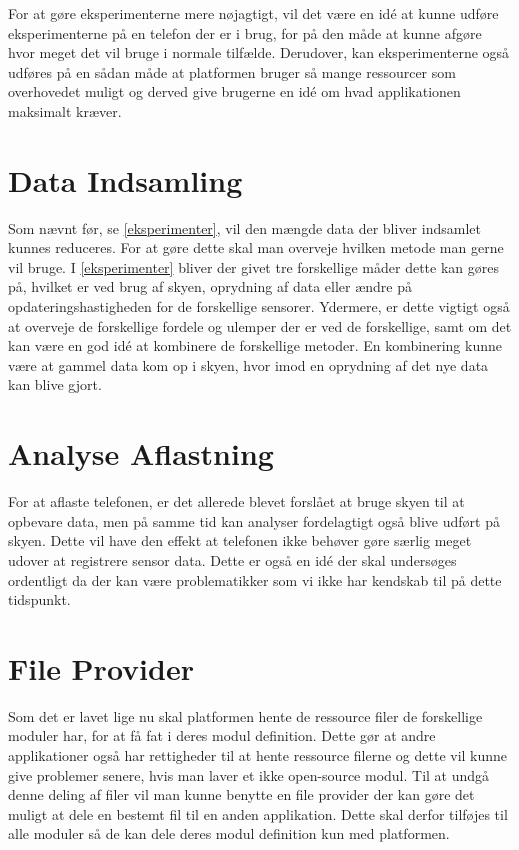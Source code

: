 For at gøre eksperimenterne mere nøjagtigt, vil det være en idé at kunne udføre eksperimenterne på en telefon der er i brug, for på den måde at kunne afgøre hvor meget det vil bruge i normale tilfælde.
Derudover, kan eksperimenterne også udføres på en sådan måde at platformen bruger så mange ressourcer som overhovedet muligt og derved give brugerne en idé om hvad applikationen maksimalt kræver. 

\section{Data Indsamling}
Som nævnt før, se \cref{eksperimenter}, vil den mængde data der bliver indsamlet kunnes reduceres.
For at gøre dette skal man overveje hvilken metode man gerne vil bruge.
I \cref{eksperimenter} bliver der givet tre forskellige måder dette kan gøres på, hvilket er ved brug af skyen, oprydning af data eller ændre på opdateringshastigheden for de forskellige sensorer.
Ydermere, er dette vigtigt også at overveje de forskellige fordele og ulemper der er ved de forskellige, samt om det kan være en god idé at kombinere de forskellige metoder.
En kombinering kunne være at gammel data kom op i skyen, hvor imod en oprydning af det nye data kan blive gjort.

\section{Analyse Aflastning}
For at aflaste telefonen, er det allerede blevet forslået at bruge skyen til at opbevare data, men på samme tid kan analyser fordelagtigt også blive udført på skyen. 
Dette vil have den effekt at telefonen ikke behøver gøre særlig meget udover at registrere sensor data.
Dette er også en idé der skal undersøges ordentligt da der kan være problematikker som vi ikke har kendskab til på dette tidspunkt. 

\section{File Provider}
Som det er lavet lige nu skal platformen hente de ressource filer de forskellige moduler har, for at få fat i deres modul definition.
Dette gør at andre applikationer også har rettigheder til at hente ressource filerne og dette vil kunne give problemer senere, hvis man laver et ikke open-source modul.
Til at undgå denne deling af filer vil man kunne benytte en file provider der kan gøre det muligt at dele en bestemt fil til en anden applikation.
Dette skal derfor tilføjes til alle moduler så de kan dele deres modul definition kun med platformen. 

